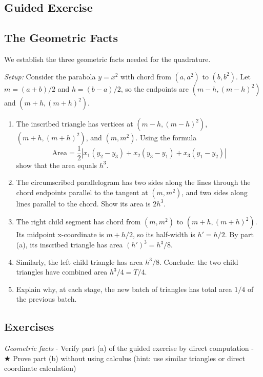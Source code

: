 \documentclass[
  10pt,
  letterpaper,
]{scrbook}
\begin{document}
\subsection{Guided Exercise}\label{guided-exercise-4}

\subsection{The Geometric Facts}\label{the-geometric-facts}

We establish the three geometric facts needed for the quadrature.

\emph{Setup:} Consider the parabola \(y = x^2\) with chord from
\((a, a^2)\) to \((b, b^2)\). Let \(m = (a+b)/2\) and \(h = (b-a)/2\),
so the endpoints are \((m-h, (m-h)^2)\) and \((m+h, (m+h)^2)\).

\begin{enumerate}
\def\labelenumi{(\alph{enumi})}
\item
  The inscribed triangle has vertices at \((m-h, (m-h)^2)\),
  \((m+h, (m+h)^2)\), and \((m, m^2)\). Using the formula
  \[\text{Area} = \frac{1}{2}|x_1(y_2 - y_3) + x_2(y_3 - y_1) + x_3(y_1 - y_2)|\]
  show that the area equals \(h^3\).
\item
  The circumscribed parallelogram has two sides along the lines through
  the chord endpoints parallel to the tangent at \((m, m^2)\), and two
  sides along lines parallel to the chord. Show its area is \(2h^3\).
\item
  The right child segment has chord from \((m, m^2)\) to
  \((m+h, (m+h)^2)\). Its midpoint x-coordinate is \(m + h/2\), so its
  half-width is \(h' = h/2\). By part (a), its inscribed triangle has
  area \((h')^3 = h^3/8\).
\item
  Similarly, the left child triangle has area \(h^3/8\). Conclude: the
  two child triangles have combined area \(h^3/4 = T/4\).
\item
  Explain why, at each stage, the new batch of triangles has total area
  \(1/4\) of the previous batch.
\end{enumerate}

\subsection{Exercises}\label{exercises-10}

\emph{Geometric facts} - Verify part (a) of the guided exercise by
direct computation - ★ Prove part (b) without using calculus (hint: use
similar triangles or direct coordinate calculation)
\end{document}
